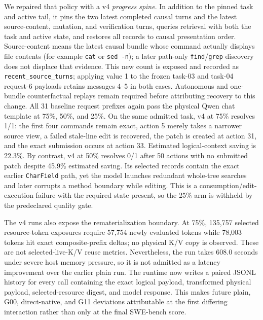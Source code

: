 \documentclass[11pt]{article}
\begin{document}
We repaired that policy with a v4 \emph{progress spine}.  In addition to the
pinned task and active tail, it pins the two latest completed causal turns and
the latest source-content, mutation, and verification turns, queries retrieval
with both the task and active state, and restores all records to causal
presentation order.  Source-content means the latest causal bundle whose
command actually displays file contents (for example \texttt{cat} or
\texttt{sed -n}); a later path-only \texttt{find}/\texttt{grep} discovery does
not displace that evidence.  This new count is exposed and recorded as
\texttt{recent\_source\_turns}; applying value 1 to the frozen task-03 and
task-04 request-6 payloads retains messages 4--5 in both cases.  Autonomous and
one-bundle counterfactual replays remain required before attributing recovery
to this change.
All 31 baseline request prefixes again pass the physical Qwen chat template at
75\%, 50\%, and 25\%.  On the same admitted task, v4 at 75\% resolves 1/1:
the first four commands remain exact, action 5 merely takes a narrower source
view, a failed stale-line edit is recovered, the patch is created at action 31,
and the exact submission occurs at action 33.  Estimated logical-context saving
is 22.3\%.  By contrast, v4 at 50\% resolves 0/1 after 50 actions with no
submitted patch despite 45.9\% estimated saving.  Its selected records contain
the exact earlier \texttt{CharField} path, yet the model launches redundant
whole-tree searches and later corrupts a method boundary while editing.  This
is a consumption/edit-execution failure with the required state present, so
the 25\% arm is withheld by the predeclared quality gate.

The v4 runs also expose the rematerialization boundary.  At 75\%, 135,757 selected
resource-token exposures require 57,754 newly evaluated tokens while 78,003
tokens hit exact composite-prefix deltas; no physical K/V copy is observed.
These are not selected-live-K/V reuse metrics.
Nevertheless, the run takes 608.0 seconds under severe host memory pressure,
so it is not admitted as a latency improvement over the earlier plain run.
The runtime now writes a paired JSONL history for every call containing the
exact logical payload, transformed physical payload, selected-resource digest,
and model response.  This makes future plain, G00, direct-native, and G11
deviations attributable at the first differing interaction rather than only at
the final SWE-bench score.
\end{document}
